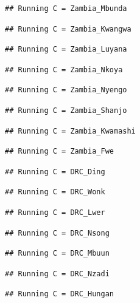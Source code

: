 \documentclass[
]{article}
\begin{document}
\begin{verbatim}
## Running C = Zambia_Mbunda
\end{verbatim}

\begin{verbatim}
## Running C = Zambia_Kwangwa
\end{verbatim}

\begin{verbatim}
## Running C = Zambia_Luyana
\end{verbatim}

\begin{verbatim}
## Running C = Zambia_Nkoya
\end{verbatim}

\begin{verbatim}
## Running C = Zambia_Nyengo
\end{verbatim}

\begin{verbatim}
## Running C = Zambia_Shanjo
\end{verbatim}

\begin{verbatim}
## Running C = Zambia_Kwamashi
\end{verbatim}

\begin{verbatim}
## Running C = Zambia_Fwe
\end{verbatim}

\begin{verbatim}
## Running C = DRC_Ding
\end{verbatim}

\begin{verbatim}
## Running C = DRC_Wonk
\end{verbatim}

\begin{verbatim}
## Running C = DRC_Lwer
\end{verbatim}

\begin{verbatim}
## Running C = DRC_Nsong
\end{verbatim}

\begin{verbatim}
## Running C = DRC_Mbuun
\end{verbatim}

\begin{verbatim}
## Running C = DRC_Nzadi
\end{verbatim}

\begin{verbatim}
## Running C = DRC_Hungan
\end{verbatim}
\end{document}
